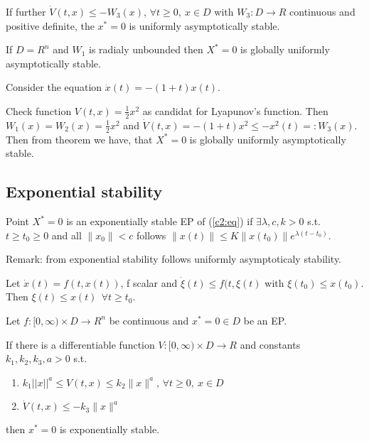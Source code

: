  If further $\dot V(t,x) \le -W_3(x)$, $\forall t\ge0,\ x\in D$ with $W_3:D \to R$
 continuous and positive definite, the $x^*=0$ is uniformly asymptotically stable.

 If $D=R^n$ and $W_1$ is radialy unbounded then $X^*=0$ is globally uniformly
 asymptotically stable.

 Consider the equation $\dot x(t) = -(1+t)x(t)$.

 Check function $V(t,x)=\frac{1}{2}x^2$ as candidat for Lyapunov's function. Then
 $W_1(x)=W_2(x)=\frac{1}{2}x^2$ and $\dot V(t,x)=-(1+t)x^2 \le -x^2(t)=: W_3(x)$.
 Then from theorem we have, that $X^*=0$  is globally uniformly asymptotically stable.


\subsection{Exponential stability}

 Point $X^*=0$ is an exponentially stable EP of (\ref{c2:eq}) if $\exists \lambda,c,k>0$
 s.t. $t \ge t_0 \ge 0$ and all $\|x_0\|<c$ follows
 $\|x(t)\|\le K\|x(t_0)\|e^{\lambda(t-t_0)}$.

Remark: from exponential stability follows uniformly asymptoticaly stability.

 Let $\dot x(t)=f(t,x(t))$, f scalar and $\dot \xi(t)\le f(t, \xi(t)$ with 
 $\xi (t_0)\le x(t_0)$. Then $\xi (t) \le x(t)\ \ \forall t\ge t_0$.

 Let $f:[0, \infty)\times D \to R^n$ be continuous and $x^*=0 \in D$ be an EP.

 If there is a differentiable function $V:[0,\infty)\times D \to R$ and constants
 $k_1,k_2,k_3,a > 0$ s.t.
 \begin{enumerate}
  \item $k_1||x||^a \le V(t,x) \le k_2\|x\|^a$, $\forall t\ge 0, \ x\in D$
  \item $\dot V(t,x) \le -k_3\|x\|^a$
 \end{enumerate}

 then $x^*=0$ is exponentially stable.

